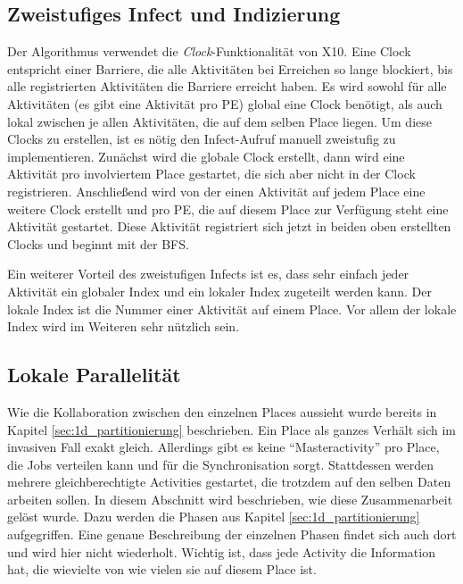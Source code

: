 \subsection{Zweistufiges Infect und Indizierung} %
\label{sub:zweistufiges_infect}
Der Algorithmus verwendet die \textit{Clock}-Funktionalität von X10. Eine Clock entspricht einer Barriere, die alle Aktivitäten bei Erreichen so lange blockiert, bis alle registrierten Aktivitäten die Barriere erreicht haben. Es wird sowohl für alle Aktivitäten (es gibt eine Aktivität pro PE) global eine Clock benötigt, als auch lokal zwischen je allen Aktivitäten, die auf dem selben Place liegen. Um diese Clocks zu erstellen, ist es nötig den Infect-Aufruf manuell zweistufig zu implementieren. Zunächst wird die globale Clock erstellt, dann wird eine Aktivität pro involviertem Place gestartet, die sich aber nicht in der Clock registrieren. Anschließend wird von der einen Aktivität auf jedem Place eine weitere Clock erstellt und pro PE, die auf diesem Place zur Verfügung steht eine Aktivität gestartet. Diese Aktivität registriert sich jetzt in beiden oben erstellten Clocks und beginnt mit der BFS.

Ein weiterer Vorteil des zweistufigen Infects ist es, dass sehr einfach jeder Aktivität ein globaler Index und ein lokaler Index zugeteilt werden kann. Der lokale Index ist die Nummer einer Aktivität auf einem Place. Vor allem der lokale Index wird im Weiteren sehr nützlich sein.

\subsection{Lokale Parallelität} %
\label{sub:lokale_parallelit_t}
Wie die Kollaboration zwischen den einzelnen Places aussieht wurde bereits in Kapitel \ref{sec:1d_partitionierung} beschrieben. Ein Place als ganzes Verhält sich im invasiven Fall exakt gleich. Allerdings gibt es keine \enquote{Masteractivity} pro Place, die Jobs verteilen kann und für die Synchronisation sorgt. Stattdessen werden mehrere gleichberechtigte Activities gestartet, die trotzdem auf den selben Daten arbeiten sollen. In diesem Abschnitt wird beschrieben, wie diese Zusammenarbeit gelöst wurde. Dazu werden die Phasen aus Kapitel \ref{sec:1d_partitionierung} aufgegriffen. Eine genaue Beschreibung der einzelnen Phasen findet sich auch dort und wird hier nicht wiederholt. Wichtig ist, dass jede Activity die Information hat, die wievielte von wie vielen sie auf diesem Place ist.

